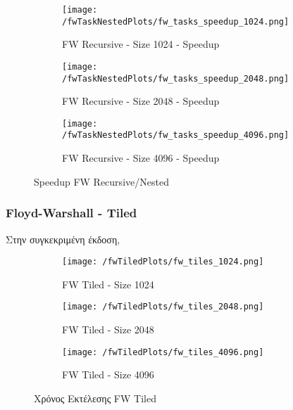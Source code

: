 \documentclass[letterpaper,12pt]{article}
\begin{document}
\begin{figure}[H]
    \centering
    \begin{subfigure}[b]{0.48\linewidth}
        \texttt{[image: /fwTaskNestedPlots/fw\_tasks\_speedup\_1024.png]}
        \caption{FW Recursive - Size 1024 - Speedup}
    \end{subfigure}
    \begin{subfigure}[b]{0.48\linewidth}
        \texttt{[image: /fwTaskNestedPlots/fw\_tasks\_speedup\_2048.png]}
        \caption{FW Recursive - Size 2048 - Speedup}
    \end{subfigure}
    \begin{subfigure}[b]{0.5\linewidth}
        \texttt{[image: /fwTaskNestedPlots/fw\_tasks\_speedup\_4096.png]}
        \caption{FW Recursive - Size 4096 - Speedup}
    \end{subfigure}
    \caption{Speedup FW Recursive/Nested}
    \label{fig:Speedup FW Recursive/Nested}
\end{figure}




\subsubsection{Floyd-Warshall - Tiled}

Στην συγκεκριμένη έκδοση,

\begin{figure}[H]
    \centering
    \begin{subfigure}[b]{0.48\linewidth}
        \texttt{[image: /fwTiledPlots/fw\_tiles\_1024.png]}
        \caption{FW Tiled - Size 1024}
    \end{subfigure}
    \begin{subfigure}[b]{0.48\linewidth}
        \texttt{[image: /fwTiledPlots/fw\_tiles\_2048.png]}
        \caption{FW Tiled - Size 2048}
    \end{subfigure}
    \begin{subfigure}[b]{0.5\linewidth}
        \texttt{[image: /fwTiledPlots/fw\_tiles\_4096.png]}
        \caption{FW Tiled - Size 4096}
    \end{subfigure}
    \caption{Χρόνος Εκτέλεσης FW Tiled}
    \label{fig:Χρόνος Εκτέλεσης FW Tiled}
\end{figure}
\end{document}
